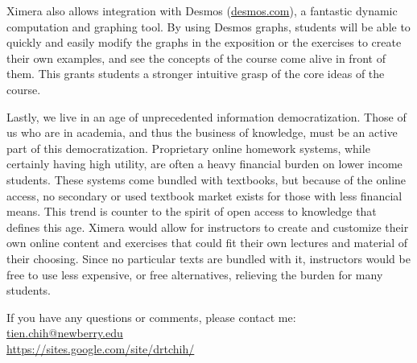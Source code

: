\documentclass{ximera}
\begin{document}
Ximera also allows integration with Desmos (\url{desmos.com}), a fantastic dynamic computation and graphing tool.  By using Desmos graphs, students will be able to quickly and easily modify the graphs in the exposition or the exercises to create their own examples, and see the concepts of the course come alive in front of them.  This grants students a stronger intuitive grasp of the core ideas of the course.

Lastly, we live  in an age of unprecedented information democratization.  Those of us who are in academia, and thus the business of knowledge, must be an active part of this democratization.  Proprietary online homework systems, while certainly having high utility,  are often a heavy financial burden on lower income students.  These systems come bundled with textbooks, but because of the online access, no secondary or used textbook market exists for those with less financial means.  This trend is counter to the spirit of open access to knowledge that defines this age.  Ximera would allow for instructors to create and customize their own online content and exercises that could fit their own lectures and material of their choosing.  Since no particular texts are bundled with it, instructors would be free to use less expensive, or free alternatives, relieving the burden for many students.


If you have any questions or comments, please contact me:\\
\href{mailto:tien.chih@newberry.edu}{tien.chih@newberry.edu}\\
\url{https://sites.google.com/site/drtchih/}
\end{document}
